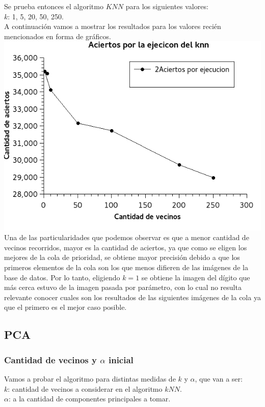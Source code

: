 Se prueba entonces el algoritmo $KNN$ para los siguientes valores:\\
$k$: 1, 5, 20, 50, 250.\\

A continuación vamos a mostrar los resultados para los valores reci\'en mencionados en forma de gráficos.
\includegraphics[scale=0.75]{ejecucionesknn.jpg}\\

Una de las particularidades que podemos observar es que a menor cantidad de vecinos recorridos, mayor es la cantidad de aciertos, ya que como se eligen los mejores de la cola de prioridad, se obtiene mayor precisión debido a que los primeros elementos de la cola son los que menos difieren de las imágenes de la base de datos.
Por lo tanto, eligiendo $k = 1$ se obtiene la imagen del dígito que más cerca estuvo de la imagen pasada por parámetro, con lo cual no resulta relevante conocer cuales son los resultados de las siguientes imágenes de la cola ya que el primero es el mejor caso posible.

\subsection{PCA}
\subsubsection{Cantidad de vecinos y $\alpha$ inicial}
Vamos a probar el algoritmo para distintas medidas de $k$ y $\alpha$, que van a ser:\\
$k$: cantidad de vecinos a considerar en el algoritmo $kNN$.\\
$\alpha$: a la cantidad de componentes principales a tomar.

